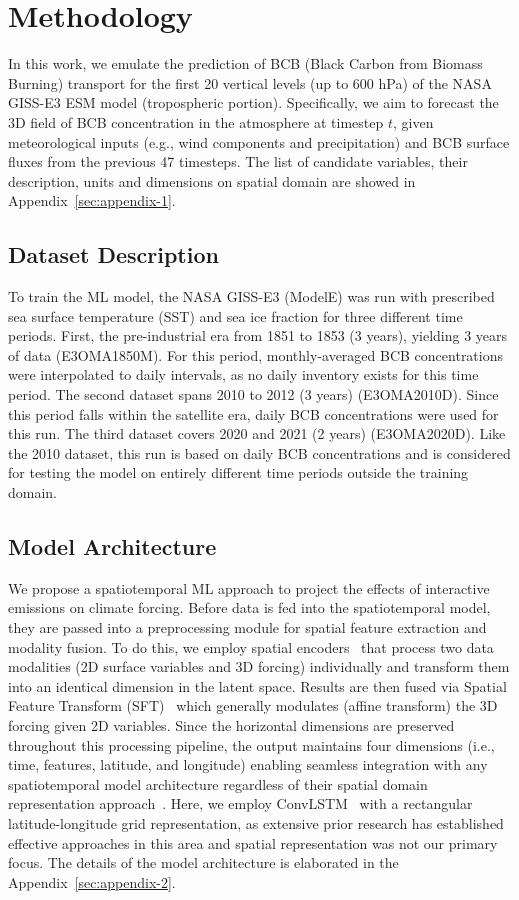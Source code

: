 \documentclass{article}
\begin{document}
\section{Methodology}
    In this work, we emulate the prediction of BCB (Black Carbon from Biomass Burning) transport for the first 20 vertical levels (up to 600 hPa) of the NASA GISS-E3 ESM model (tropospheric portion). Specifically, we aim to forecast the 3D field of BCB concentration in the atmosphere at timestep $t$, given meteorological inputs (e.g., wind components and precipitation) and BCB surface fluxes from the previous 47 timesteps. The list of candidate variables, their description, units and dimensions on spatial domain are showed in Appendix~\ref{sec:appendix-1}.
    
    \subsection{Dataset Description}
        To train the ML model, the NASA GISS-E3 (ModelE) was run with prescribed sea surface temperature (SST) and sea ice fraction for three different time periods. First, the pre-industrial era from 1851 to 1853 (3 years), yielding 3 years of data (E3OMA1850M). For this period, monthly-averaged BCB concentrations were interpolated to daily intervals, as no daily inventory exists for this time period. The second dataset spans 2010 to 2012 (3 years) (E3OMA2010D). Since this period falls within the satellite era, daily BCB concentrations were used for this run. The third dataset covers 2020 and 2021 (2 years) (E3OMA2020D). Like the 2010 dataset, this run is based on daily BCB concentrations and is considered for testing the model on entirely different time periods outside the training domain.

    \subsection{Model Architecture}
        We propose a spatiotemporal ML approach to project the effects of interactive emissions on climate forcing. Before data is fed into the spatiotemporal model, they are passed into a preprocessing module for spatial feature extraction and modality fusion. To do this, we employ spatial encoders~\cite{tan2023temporal} that process two data modalities (2D surface variables and 3D forcing) individually and transform them into an identical dimension in the latent space. Results are then fused via Spatial Feature Transform (SFT)~\cite{wang2018recovering} which generally modulates (affine transform) the 3D forcing given 2D variables. Since the horizontal dimensions are preserved throughout this processing pipeline, the output maintains four dimensions (i.e., time, features, latitude, and longitude) enabling seamless integration with any spatiotemporal model architecture regardless of their spatial domain representation approach~\cite{tan2023openstl}. Here, we employ ConvLSTM~\cite{shi2015convolutional} with a rectangular latitude-longitude grid representation, as extensive prior research has established effective approaches in this area and spatial representation was not our primary focus. The details of the model architecture is elaborated in the Appendix~\ref{sec:appendix-2}.
        
\end{document}

